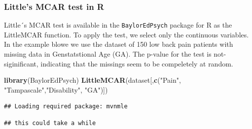 \documentclass[]{book}
\newenvironment{Shaded}{\begin{snugshade}}{\end{snugshade}}
\newcommand{\KeywordTok}[1]{\textcolor[rgb]{0.13,0.29,0.53}{\textbf{#1}}}
\newcommand{\StringTok}[1]{\textcolor[rgb]{0.31,0.60,0.02}{#1}}
\newcommand{\NormalTok}[1]{#1}
\theoremstyle{definition}
\theoremstyle{definition}
\theoremstyle{definition}
\theoremstyle{remark}
\begin{document}
\subsubsection{Little's MCAR test in R}\label{littles-mcar-test-in-r}

Little´s MCAR test is available in the \texttt{BaylorEdPsych} package
for R as the LittleMCAR function. To apply the test, we select only the
continuous variables. In the example blowe we use the dataset of 150 low
back pain patients with missing data in Genstatstional Age (GA). The
p-value for the test is not-siginificant, indicating that the missings
seem to be compeletely at random.

\begin{Shaded}
\begin{Highlighting}[]
\KeywordTok{library}\NormalTok{(BaylorEdPsych)}
\KeywordTok{LittleMCAR}\NormalTok{(dataset[,}\KeywordTok{c}\NormalTok{(}\StringTok{"Pain"}\NormalTok{, }\StringTok{"Tampascale"}\NormalTok{,}\StringTok{"Disability"}\NormalTok{, }\StringTok{"GA"}\NormalTok{)])}
\end{Highlighting}
\end{Shaded}

\begin{verbatim}
## Loading required package: mvnmle
\end{verbatim}

\begin{verbatim}
## this could take a while
\end{verbatim}
\end{document}
